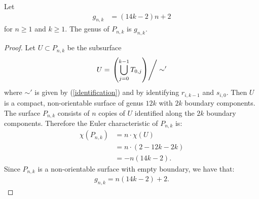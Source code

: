 \begin{lem}
\label{lem:genera}
Let
\begin{align*}
    g_{n,k} &= (14k - 2)n + 2
\end{align*} for $n \geq 1$ and $k \geq 1$.
    The genus of $P_{n,k}$ is $g_{n,k}$.
\end{lem}
\begin{proof}
  Let $U \subset P_{n,k}$ be the subsurface
  \begin{align*}
    U = \left. \left( \bigcup_{j =0}^{k-1} T_{0,j} \right)\right/\sim'
  \end{align*}
  where $\sim'$ is given by (\ref{identification}) and by identifying $r_{i,k-1}$ and $s_{i,0}$.
  Then $U$ is a compact, non-orientable surface of genus $12k$ with $2k$ boundary components.  %
  The surface $P_{n,k}$ consists of $n$ copies of $U$ identified along the $2k$ boundary components.  Therefore the Euler characteristic of $P_{n,k}$ is:
  \begin{align*}
    \chi(P_{n,k}) &= n \cdot \chi(U)\\
                  &=n\cdot(2-12k-2k)\\
                  &= -n(14k - 2).
  \end{align*}
  Since $P_{n,k}$ is a non-orientable surface with empty boundary, we have that:
  \begin{align*}
    g_{n,k} = n(14k-2) + 2.
  \end{align*}
\end{proof}

